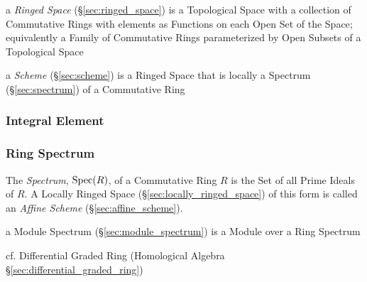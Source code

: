 \fist a \emph{Ringed Space} (\S\ref{sec:ringed_space}) is a Topological Space
with a collection of Commutative Rings with elements as Functions on each Open
Set of the Space; equivalently a Family of Commutative Rings parameterized by
Open Subsets of a Topological Space

\fist a \emph{Scheme} (\S\ref{sec:scheme}) is a Ringed Space that is locally a
Spectrum (\S\ref{sec:spectrum}) of a Commutative Ring



\subsubsection{Integral Element}\label{sec:integral_element}

\subsubsection{Ring Spectrum}\label{sec:ring_spectrum}

The \emph{Spectrum}, $\mathrm{Spec}(R)$, of a Commutative Ring $R$ is the Set of all
Prime Ideals of $R$. A Locally Ringed Space (\S\ref{sec:locally_ringed_space})
of this form is called an \emph{Affine Scheme} (\S\ref{sec:affine_scheme}).

a Module Spectrum (\S\ref{sec:module_spectrum}) is a Module over a Ring Spectrum

cf. Differential Graded Ring (Homological Algebra
\S\ref{sec:differential_graded_ring})

